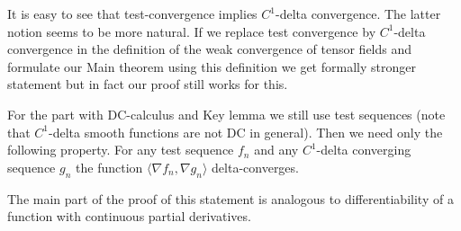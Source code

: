 It is easy to see that test-convergence implies $C^1$-delta convergence.
The latter notion seems to be more natural.
If we replace test convergence
by $C^1$-delta convergence
in the definition of the weak convergence of tensor fields and
formulate our Main theorem using this definition we get formally stronger
statement but in fact our proof 
still works for this.

For the part with DC-calculus and 
Key lemma we still use test sequences
(note that $C^1$-delta smooth functions are not DC in general).
Then we need only
the following property. 
For any test sequence $f_n$
and any $C^1$-delta converging
sequence $g_n$ the function
$\langle \nabla f_n , \nabla g_n
\rangle$ delta-converges.



The main part of the proof of this statement is analogous to differentiability of a function with continuous partial derivatives. 